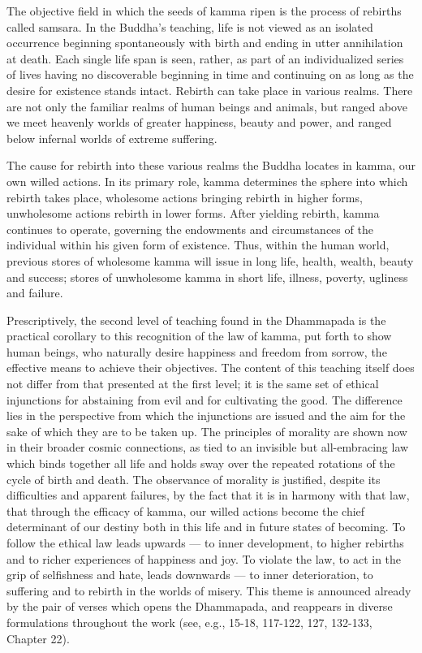 \begin{enumerate}[i]
The objective field in which the seeds of kamma ripen is the process of rebirths called samsara. In the Buddha's teaching, life is not viewed as an isolated occurrence beginning spontaneously with birth and ending in utter annihilation at death. Each single life span is seen, rather, as part of an individualized series of lives having no discoverable beginning in time and continuing on as long as the desire for existence stands intact. Rebirth can take place in various realms. There are not only the familiar realms of human beings and animals, but ranged above we meet heavenly worlds of greater happiness, beauty and power, and ranged below infernal worlds of extreme suffering.

The cause for rebirth into these various realms the Buddha locates in kamma, our own willed actions. In its primary role, kamma determines the sphere into which rebirth takes place, wholesome actions bringing rebirth in higher forms, unwholesome actions rebirth in lower forms. After yielding rebirth, kamma continues to operate, governing the endowments and circumstances of the individual within his given form of existence. Thus, within the human world, previous stores of wholesome kamma will issue in long life, health, wealth, beauty and success; stores of unwholesome kamma in short life, illness, poverty, ugliness and failure.

Prescriptively, the second level of teaching found in the Dhammapada is the practical corollary to this recognition of the law of kamma, put forth to show human beings, who naturally desire happiness and freedom from sorrow, the effective means to achieve their objectives. The content of this teaching itself does not differ from that presented at the first level; it is the same set of ethical injunctions for abstaining from evil and for cultivating the good. The difference lies in the perspective from which the injunctions are issued and the aim for the sake of which they are to be taken up. The principles of morality are shown now in their broader cosmic connections, as tied to an invisible but all-embracing law which binds together all life and holds sway over the repeated rotations of the cycle of birth and death. The observance of morality is justified, despite its difficulties and apparent failures, by the fact that it is in harmony with that law, that through the efficacy of kamma, our willed actions become the chief determinant of our destiny both in this life and in future states of becoming. To follow the ethical law leads upwards — to inner development, to higher rebirths and to richer experiences of happiness and joy. To violate the law, to act in the grip of selfishness and hate, leads downwards — to inner deterioration, to suffering and to rebirth in the worlds of misery. This theme is announced already by the pair of verses which opens the Dhammapada, and reappears in diverse formulations throughout the work (see, e.g., 15-18, 117-122, 127, 132-133, Chapter 22).


\end{enumerate}
